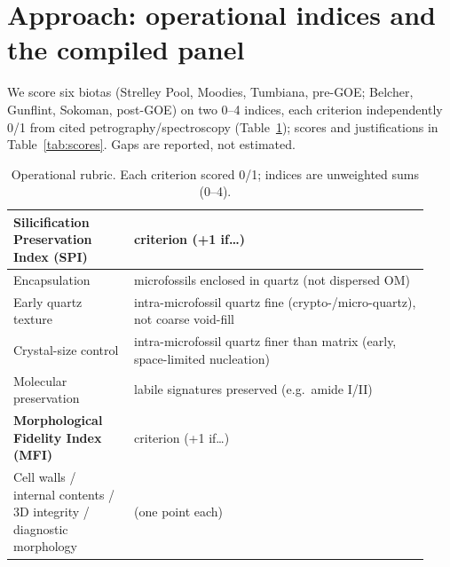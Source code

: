 \documentclass[11pt]{article}
\begin{document}
\section{Approach: operational indices and the compiled panel}

We score six biotas (Strelley Pool, Moodies, Tumbiana, pre-GOE; Belcher, Gunflint, Sokoman,
post-GOE) on two 0--4 indices, each criterion independently 0/1 from cited petrography/spectroscopy
(Table~\ref{tab:rubric}); scores and justifications in Table~\ref{tab:scores}. Gaps are reported,
not estimated.

\begin{table}[t]
\centering\small
\caption{Operational rubric. Each criterion scored 0/1; indices are unweighted sums (0--4).}
\label{tab:rubric}
\begin{tabular}{p{0.27\linewidth}p{0.66\linewidth}}
\toprule
\textbf{Silicification Preservation Index (SPI)} & criterion (+1 if\ldots) \\
\midrule
Encapsulation & microfossils enclosed in quartz (not dispersed OM) \\
Early quartz texture & intra-microfossil quartz fine (crypto-/micro-quartz), not coarse void-fill \\
Crystal-size control & intra-microfossil quartz finer than matrix (early, space-limited nucleation) \\
Molecular preservation & labile signatures preserved (e.g.\ amide I/II) \\
\midrule
\textbf{Morphological Fidelity Index (MFI)} & criterion (+1 if\ldots) \\
\midrule
Cell walls / internal contents / 3D integrity / diagnostic morphology & (one point each) \\
\bottomrule
\end{tabular}
\end{table}
\end{document}
